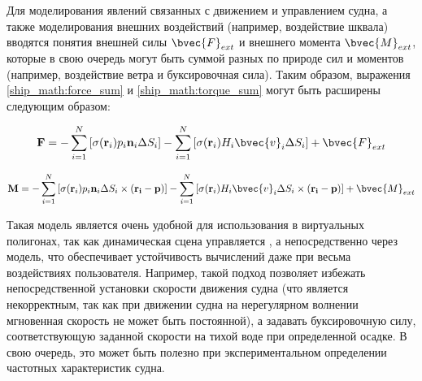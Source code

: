 
Для моделирования явлений связанных с движением и управлением судна, а также моделирования внешних воздействий (например, воздействие шквала) вводятся понятия внешней силы $\bvec{F}_{ext}$ и внешнего момента $\bvec{M}_{ext}$, которые в свою очередь могут быть суммой разных по природе сил и моментов (например, воздействие ветра и буксировочная сила). Таким образом, выражения \eqref{ship_math:force_sum} и  \eqref{ship_math:torque_sum} могут быть расширены следующим образом:


\begin{equation}
	\mathbf{F} = 
		-\sum_{i=1}^{N} \left[
			\sigma (\mathbf{r}_i) p_i \mathbf{n}_i \Delta S_i
		\right]
		-\sum_{i=1}^{N} \left[
			\sigma (\mathbf{r}_i) H_i \bvec{v}_i \Delta S_i
		\right] 
		+ \bvec{F}_{ext}
\end{equation}

\begin{equation}
	\mathbf{M} = 
		-\sum_{i=1}^{N} \left[
			\sigma (\mathbf{r}_i) p_i \mathbf{n}_i \Delta S_i \times (\mathbf{r_i} - \mathbf{p})
		\right]
		-\sum_{i=1}^{N} \left[
			\sigma (\mathbf{r}_i) H_i \bvec{v}_i \Delta S_i \times (\mathbf{r_i} - \mathbf{p})
		\right]
		+ \bvec{M}_{ext}
\end{equation}

Такая модель является очень удобной для использования в виртуальных полигонах, так как динамическая сцена управляется , а непосредственно через модель, что обеспечивает устойчивость вычислений даже при весьма  воздействиях пользователя. Например, такой подход позволяет избежать непосредственной установки скорости движения судна (что является некорректным, так как при движении судна на нерегулярном волнении мгновенная скорость не может быть постоянной), а задавать буксировочную силу, соответствующую заданной скорости на тихой воде при определенной осадке. В свою очередь, это может быть полезно при экспериментальном определении частотных характеристик судна.

